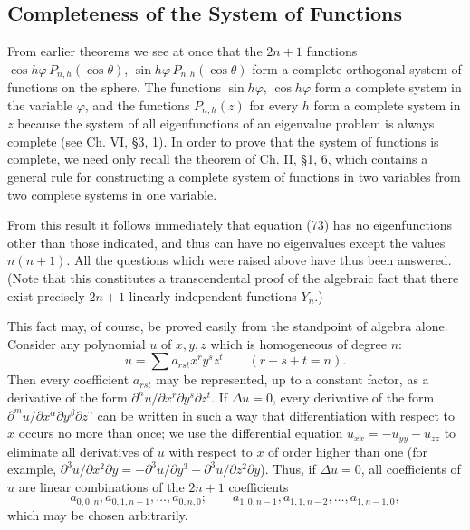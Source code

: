 \subsection{Completeness of the System of Functions}
From earlier theorems we see at once that the $2n+1$ functions $\cos h\varphi\,\allowbreak P_{n,h}(\cos\theta)$, $\sin h\varphi\,\allowbreak P_{n,h}(\cos\theta)$ form a complete orthogonal system of functions on the sphere. The functions $\sin h\varphi$, $\cos h\varphi$ form a complete system in the variable $\varphi$, and the functions $P_{n,h}(z)$ for every $h$ form a complete system in $z$ because the system of all eigenfunctions of an eigenvalue problem is always complete (see Ch. VI, \S3, 1). In order to prove that the system of functions is complete, we need only recall the theorem of Ch. II, \S1, 6, which contains a general rule for constructing a complete system of functions in two variables from two complete systems in one variable.

From this result it follows immediately that equation (73) has no eigenfunctions other than those indicated, and thus can have no eigenvalues except the values $n(n+1)$. All the questions which were raised above have thus been answered. (Note that this constitutes a transcendental proof of the algebraic fact that there exist precisely $2n+1$ linearly independent functions $Y_n$.)

This fact may, of course, be proved easily from the standpoint of algebra alone. Consider any polynomial $u$ of $x,y,z$ which is homogeneous of degree $n$:
\[
u=\sum a_{rst}x^ry^sz^t\qquad(r+s+t=n).
\]
Then every coefficient $a_{rst}$ may be represented, up to a constant factor, as a derivative of the form $\partial^n u/\partial x^r\partial y^s\partial z^t$. If $\Delta u=0$, every derivative of the form $\partial^m u/\partial x^\alpha\partial y^\beta\partial z^\gamma$ can be written in such a way that differentiation with respect to $x$ occurs no more than once; we use the differential equation $u_{xx}=-u_{yy}-u_{zz}$ to eliminate all derivatives of $u$ with respect to $x$ of order higher than one (for example, $\partial^3u/\partial x^2\partial y=-\partial^3u/\partial y^3-\partial^3u/\partial z^2\partial y$). Thus, if $\Delta u=0$, all coefficients of $u$ are linear combinations of the $2n+1$ coefficients
\[
a_{0,0,n},a_{0,1,n-1},\ldots,a_{0,n,0};\qquad
a_{1,0,n-1},a_{1,1,n-2},\ldots,a_{1,n-1,0},
\]
which may be chosen arbitrarily.

